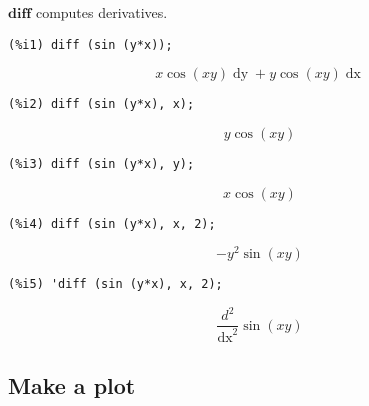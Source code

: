 \documentclass[12pt,leqno]{article}
\begin{document}
$\mathbf{diff}$ computes derivatives.
\begin{verbatim}
(%i1) diff (sin (y*x));
\end{verbatim}
\begin{dmath}[number={\(\mathop{\mathrm{\%o}_{1}}\)}]
x \cos \left(x y\right) \mathop{dy}+y \cos \left(x y\right) \mathop{dx}
\end{dmath}
\begin{verbatim}
(%i2) diff (sin (y*x), x);
\end{verbatim}
\begin{dmath}[number={\(\mathop{\mathrm{\%o}_{2}}\)}]
y \cos \left(x y\right)
\end{dmath}
\begin{verbatim}
(%i3) diff (sin (y*x), y);
\end{verbatim}
\begin{dmath}[number={\(\mathop{\mathrm{\%o}_{3}}\)}]
x \cos \left(x y\right)
\end{dmath}
\begin{verbatim}
(%i4) diff (sin (y*x), x, 2);
\end{verbatim}
\begin{dmath}[number={\(\mathop{\mathrm{\%o}_{4}}\)}]
-{y}^{2} \sin \left(x y\right)
\end{dmath}
\begin{verbatim}
(%i5) 'diff (sin (y*x), x, 2);
\end{verbatim}
\begin{dmath}[number={\(\mathop{\mathrm{\%o}_{5}}\)}]
\frac{d^{2}}{\mathop{dx}^{2}}\sin \left(x y\right)
\end{dmath}


\subsection{Make a plot}
\end{document}
